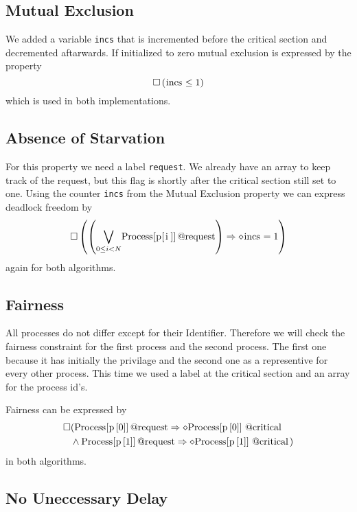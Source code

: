 \documentclass{llncs}
\begin{document}
\subsection{Mutual Exclusion}

We added a variable \lstinline|incs| that is incremented before the critical section
and decremented aftarwards. If initialized to zero mutual exclusion is expressed by the
property
\begin{equation}
    \square \left( \text{\lstinline|incs|} \leq 1 \right)
\end{equation}
which is used in both implementations.

\subsection{Absence of Starvation}

For this property we need a label \lstinline|request|. We already have an array to keep track of the request,
but this flag is shortly after the critical section still set to one.
Using the counter \lstinline|incs| from the Mutual Exclusion property we can express deadlock freedom by
\begin{equation}
    \square \left( \left( \underset{0\leq i < N}{\bigvee} \text{\lstinline|Process[p[i]]@request|}\right) \Rightarrow \diamond \text{\lstinline|incs|} = 1 \right)
\end{equation}
again for both algorithms.
\subsection{Fairness}

All processes do not differ except for their Identifier. Therefore we will check the fairness constraint for the first process and the second process.
The first one because it has initially the privilage and the second one as a representive for every other process.
This time we used a label at the critical section and an array for the process id's.

Fairness can be expressed by
\begin{eqnarray}
    \square & ( \text{\lstinline|Process[p[0]]@request|} \Rightarrow \diamond \text{\lstinline|Process[p[0]]@critical|} \\
    &\land \text{\lstinline|Process[p[1]]@request|}\Rightarrow \diamond \text{\lstinline|Process[p[1]]@critical|})
\end{eqnarray}
in both algorithms.

\subsection{No Uneccessary Delay}
\end{document}
